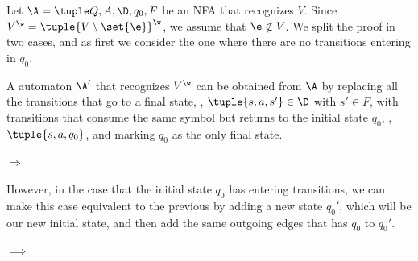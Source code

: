 \documentclass[oneside]{academica}
\begin{document}
\begin{proof*}
  Let $\A = \NBA$ be an NFA that recognizes $V$.
  Since $V^\w = \tuple{V \setminus \set{\e}}^\w$, we assume that $\e \notin V$.
  We split the proof in two cases, and as first we consider the one where there are no transitions entering in $q_0$.

  \bigskip
  A \Buchi automaton $\A'$ that recognizes $V^\w$ can be obtained from $\A$ by replacing all the transitions that go to a final state, \ie, $\tuple{s, a, s'} \in \D$ with $s' \in F$, with transitions that consume the same symbol but returns to the initial state $q_0$, \ie, $\tuple{s, a, q_0}$, and marking $q_0$ as the only final state.
  \begin{displaybox}
    \begin{minipage}{0.5\textwidth}
      \begin{center}
        
      \end{center}
    \end{minipage}
    \begin{minipage}{0.05\textwidth}
      \begin{center}
        $\Rightarrow$
      \end{center}
    \end{minipage}
    \begin{minipage}{0.4\textwidth}
      \begin{center}
        
      \end{center}
    \end{minipage}
  \end{displaybox}

  However, in the case that the initial state $q_0$ has entering transitions, we can make this case equivalent to the previous by adding a new state $q_0'$, which will be our new initial state, and then add the same outgoing edges that has $q_0$ to $q_0'$.
  \begin{displaybox}
    \begin{minipage}{0.4\textwidth}
      \begin{center}
        
      \end{center}
    \end{minipage}
    \begin{minipage}{0.05\textwidth}
      \begin{center}
        $\implies$
      \end{center}
    \end{minipage}
    \begin{minipage}{0.5\textwidth}
      \begin{center}
        
      \end{center}
    \end{minipage}
  \end{displaybox}
\end{proof*}
\end{document}
